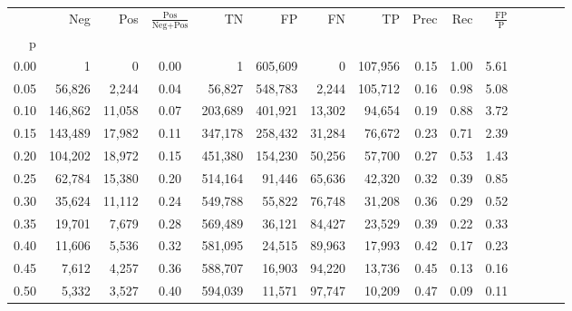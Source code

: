 \begin{tabular}{rrrcrrrrrrrrrrr}
\toprule
{} &      Neg &     Pos & $\frac{\text{Pos}}{\text{Neg}+\text{Pos}}$ &       TN &       FP &       FN &       TP &  Prec &   Rec & $\frac{\text{FP}}{\text{P}}$ \\
p    &          &         &                                            &          &          &          &          &       &       &                              \\
\midrule
0.00 &        1 &       0 &                                       0.00 &        1 &  605,609 &        0 &  107,956 &  0.15 &  1.00 &                         5.61 \\
0.05 &   56,826 &   2,244 &                                       0.04 &   56,827 &  548,783 &    2,244 &  105,712 &  0.16 &  0.98 &                         5.08 \\
0.10 &  146,862 &  11,058 &                                       0.07 &  203,689 &  401,921 &   13,302 &   94,654 &  0.19 &  0.88 &                         3.72 \\
0.15 &  143,489 &  17,982 &                                       0.11 &  347,178 &  258,432 &   31,284 &   76,672 &  0.23 &  0.71 &                         2.39 \\
0.20 &  104,202 &  18,972 &                                       0.15 &  451,380 &  154,230 &   50,256 &   57,700 &  0.27 &  0.53 &                         1.43 \\
0.25 &   62,784 &  15,380 &                                       0.20 &  514,164 &   91,446 &   65,636 &   42,320 &  0.32 &  0.39 &                         0.85 \\
0.30 &   35,624 &  11,112 &                                       0.24 &  549,788 &   55,822 &   76,748 &   31,208 &  0.36 &  0.29 &                         0.52 \\
0.35 &   19,701 &   7,679 &                                       0.28 &  569,489 &   36,121 &   84,427 &   23,529 &  0.39 &  0.22 &                         0.33 \\
0.40 &   11,606 &   5,536 &                                       0.32 &  581,095 &   24,515 &   89,963 &   17,993 &  0.42 &  0.17 &                         0.23 \\
0.45 &    7,612 &   4,257 &                                       0.36 &  588,707 &   16,903 &   94,220 &   13,736 &  0.45 &  0.13 &                         0.16 \\
0.50 &    5,332 &   3,527 &                                       0.40 &  594,039 &   11,571 &   97,747 &   10,209 &  0.47 &  0.09 &                         0.11 \\

\end{tabular}
